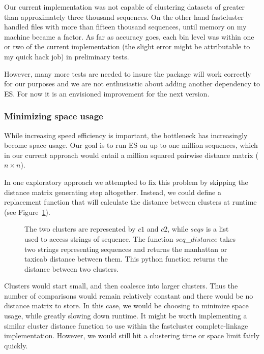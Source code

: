 Our current implementation was not capable of clustering datasets of greater than approximately three thousand sequences.
On the other hand fastcluster handled files with more than fifteen thousand sequences, until memory on my machine became a factor.
As far as accuracy goes, each bin level was within one or two of the current implementation (the slight error might be attributable to my quick hack job) in preliminary tests.

However, many more tests are needed to insure the package will work correctly for our purposes and we are not enthusiastic about adding another dependency to ES.
For now it is an envisioned improvement for the next version.

\subsubsection*{Minimizing space usage}
While increasing speed efficiency is important, the bottleneck has increasingly become space usage.
Our goal is to run ES on up to one million sequences, which in our current approach would entail a million squared pairwise distance matrix ($n \times n$).

In one exploratory approach we attempted to fix this problem by skipping the distance matrix generating step altogether.
Instead, we could define a replacement function that will calculate the distance between clusters at runtime (see Figure~\ref{code:LazyClustering}).

\begin{figure}[h!]
\noindent{}
\caption[Python code showing a distance function for two clusters.]{The two clusters are represented by $c1$ and $c2$, while $seqs$ is a list used to access strings of sequence. The function $seq$\_$distance$ takes two strings representing sequences and returns the manhattan or taxicab distance between them. This python function returns the distance between two clusters.}
\label{code:LazyClustering}
\end{figure}

Clusters would start small, and then coalesce into larger clusters.
Thus the number of comparisons would remain relatively constant and there would be no distance matrix to store.
In this case, we would be choosing to minimize space usage, while greatly slowing down runtime.
It might be worth implementing a similar cluster distance function to use within the fastcluster complete-linkage implementation.
However, we would still hit a clustering time or space limit fairly quickly.

